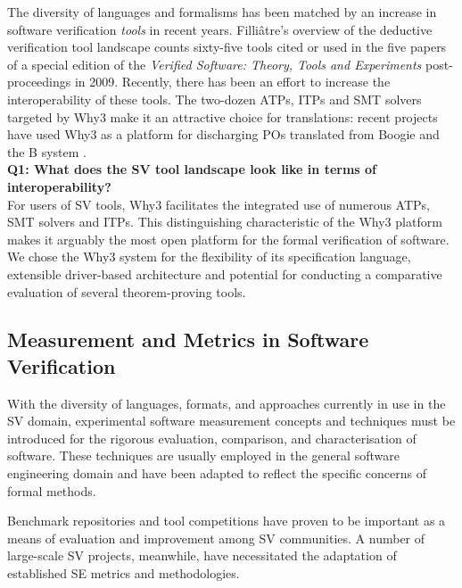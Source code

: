 The diversity of languages and formalisms has been matched by an increase in software verification \textit{tools} in recent years. 
Filli{\^a}tre's overview of the deductive verification tool landscape \cite{deductiveSV} counts sixty-five tools cited or used in the five papers of a special edition of the \textit{Verified Software: Theory, Tools and Experiments} post-proceedings in 2009. 
Recently, there has been an effort to increase the interoperability of these tools. 
The two-dozen ATPs, ITPs and SMT solvers targeted by \textsf{Why3} make it an attractive choice for translations: recent projects have used \textsf{Why3} as a platform for discharging POs translated from Boogie \cite{b2w} and the B system \cite{rodinplugin,atelierB2w}. \\

\textbf{Q1: What does the SV tool landscape look like in terms of interoperability?} \\
For users of SV tools, \textsf{Why3} facilitates the integrated use of numerous ATPs, SMT solvers and ITPs. 
This distinguishing characteristic of the \textsf{Why3} platform makes it arguably the most open platform for the formal verification of software.  
We chose the \textsf{Why3} system for the flexibility of its specification language, extensible driver-based architecture and potential for conducting a comparative evaluation of several theorem-proving tools.

\subsection{Measurement and Metrics in Software Verification}
\label{sub:lrsvmm}

With the diversity of languages, formats, and approaches currently in use in the SV domain, experimental software measurement concepts and techniques must be introduced for the rigorous evaluation, comparison, and characterisation of software. These techniques are usually employed in the general software engineering domain and have been adapted to reflect the specific concerns of formal methods. 

Benchmark repositories and tool competitions have proven to be important as a means of evaluation and improvement among SV communities. A number of large-scale SV projects, meanwhile, have necessitated the adaptation of established SE metrics and methodologies.         
 
